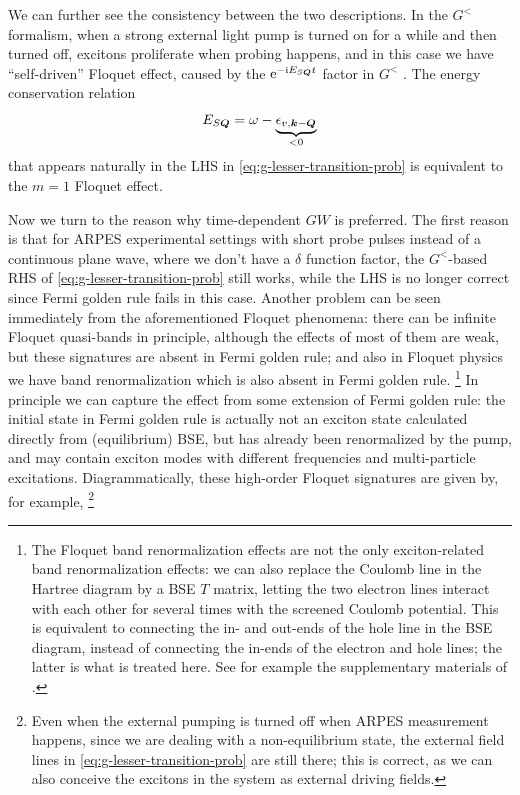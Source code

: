 \documentclass[hyperref, a4paper, 12pt]{report}
\newcommand*{\ii}{\mathrm{i}}
\newcommand*{\ee}{\mathrm{e}}
\begin{document}
We can further see the consistency between the two descriptions.
In the $G^<$ formalism,
when a strong external light pump is turned on for a while and then turned off, 
excitons proliferate when probing happens, 
and in this case we have ``self-driven'' Floquet effect,
caused by the $\ee^{- \ii E_{S \vb*{Q}} t}$ factor in $G^<$ \cite{chan2023giant}.
The energy conservation relation 
\begin{equation}
    E_{S \vb*{Q}} = \omega - \underbrace{\epsilon_{v, \vb*{k} - \vb*{Q}}}_{< 0}
\end{equation}
that appears naturally in the LHS in \eqref{eq:g-lesser-transition-prob}
is equivalent to the $m=1$ Floquet effect.

Now we turn to the reason why time-dependent $GW$ is preferred.
The first reason is that for ARPES experimental settings with short probe pulses 
instead of a continuous plane wave, 
where we don't have a $\delta$ function factor,
the $G^<$-based RHS of \eqref{eq:g-lesser-transition-prob} still works, 
while the LHS is no longer correct since Fermi golden rule fails in this case.
Another problem can be seen immediately from the aforementioned Floquet phenomena:
there can be infinite Floquet quasi-bands in principle,
although the effects of most of them are weak,
but these signatures are absent in Fermi golden rule; 
and also in Floquet physics we have band renormalization 
which is also absent in Fermi golden rule.%
\footnote{
    The Floquet band renormalization effects are not the only exciton-related band renormalization effects:
    we can also replace the Coulomb line in the Hartree diagram by a BSE $T$ matrix,
    letting the two electron lines interact with each other for several times with the screened Coulomb potential.
    This is equivalent to connecting the in- and out-ends of the hole line in the BSE diagram, 
    instead of connecting the in-ends of the electron and hole lines; 
    the latter is what is treated here.
    See for example the supplementary materials of \cite{lin2022exciton}.
}
In principle we can capture the effect from some extension of Fermi golden rule:
the initial state in Fermi golden rule 
is actually not an exciton state calculated directly from (equilibrium) BSE, 
but has already been renormalized by the pump, 
and may contain exciton modes with different frequencies
and multi-particle excitations.
Diagrammatically, these high-order Floquet signatures are given by, for example,%
\footnote{
    Even when the external pumping is turned off when ARPES measurement happens, 
    since we are dealing with a non-equilibrium state, 
    the external field lines in \eqref{eq:g-lesser-transition-prob} are still there; 
    this is correct, 
    as we can also conceive the excitons in the system as external driving fields.
} 
\end{document}
